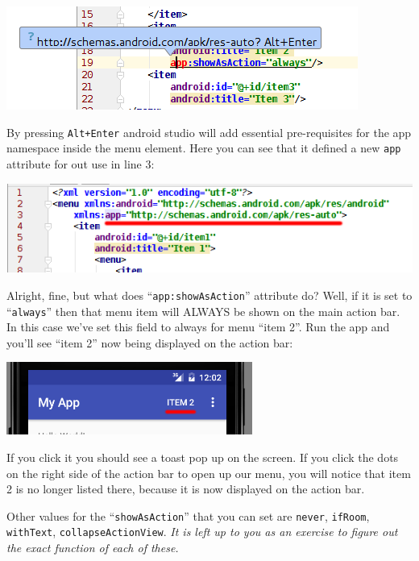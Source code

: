 \begin{center}
	\includegraphics[scale=0.4]{chapters/ch07/images/52}
\end{center}

By pressing \texttt{Alt+Enter} android studio will add essential pre-requisites for the app namespace inside the menu element. Here you can see that it defined a new \texttt{app} attribute for out use in line 3:

\begin{center}
	\includegraphics[scale=0.4]{chapters/ch07/images/53}
\end{center}

Alright, fine, but what does ``\texttt{app:showAsAction}'' attribute do? Well, if it is set to ``\texttt{always}'' then that menu item will ALWAYS be shown on the main action bar. In this case we've set this field to always for menu ``item 2''. Run the app and you'll see ``item 2'' now being displayed on the action bar:

\begin{center}
	\includegraphics[scale=0.4]{chapters/ch07/images/54}
\end{center}

If you click it you should see a toast pop up on the screen. If you click the dots on the right side of the action bar to open up our menu, you will notice that item 2 is no longer listed there, because it is now displayed on the action bar. 

Other values for the ``\texttt{showAsAction}'' that you can set are \texttt{never}, \texttt{ifRoom}, \texttt{withText}, \texttt{collapseActionView}. \textit{It is left up to you as an exercise to figure out the exact function of each of these.}

